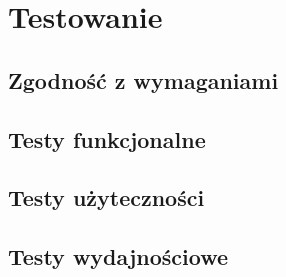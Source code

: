 \chapter{Testowanie}

\section{Zgodność z wymaganiami}
\section{Testy funkcjonalne}
\section{Testy użyteczności}
\section{Testy wydajnościowe}

